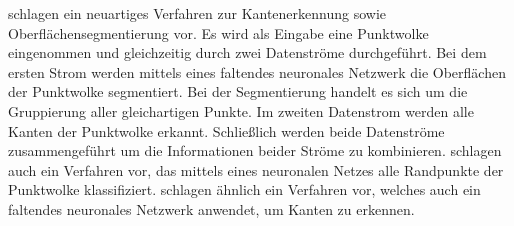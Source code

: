 \Textcite{hu_jsenet_2020} schlagen ein neuartiges Verfahren zur Kantenerkennung sowie Oberflächensegmentierung vor. Es wird als Eingabe eine Punktwolke eingenommen und gleichzeitig durch zwei Datenströme durchgeführt. Bei dem ersten Strom werden mittels eines faltendes neuronales Netzwerk die Oberflächen der Punktwolke segmentiert. Bei der Segmentierung handelt es sich um die Gruppierung aller gleichartigen Punkte. Im zweiten Datenstrom werden alle Kanten der Punktwolke erkannt. Schließlich werden beide Datenströme zusammengeführt um die Informationen beider Ströme zu kombinieren. \Textcite{bazazian_edc-net_2021} schlagen auch ein Verfahren vor, das mittels eines neuronalen Netzes alle Randpunkte der Punktwolke klassifiziert. \Textcite{himeur_pcednet_2021} schlagen ähnlich ein Verfahren vor, welches auch ein faltendes neuronales Netzwerk anwendet, um Kanten zu erkennen. 

